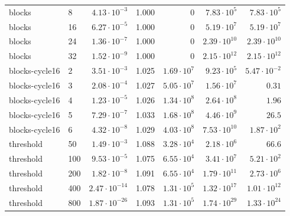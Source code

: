 \begin{tabular}{llrrrrr}
blocks & 8 & $4.13\cdot10^{-3}$ & 1.000 & $0$ & $7.83\cdot10^{5}$ & $7.83\cdot10^{5}$\\
blocks & 16 & $6.27\cdot10^{-5}$ & 1.000 & $0$ & $5.19\cdot10^{7}$ & $5.19\cdot10^{7}$\\
blocks & 24 & $1.36\cdot10^{-7}$ & 1.000 & $0$ & $2.39\cdot10^{10}$ & $2.39\cdot10^{10}$\\
blocks & 32 & $1.52\cdot10^{-9}$ & 1.000 & $0$ & $2.15\cdot10^{12}$ & $2.15\cdot10^{12}$\\
blocks-cycle16 & 2 & $3.51\cdot10^{-3}$ & 1.025 & $1.69\cdot10^{7}$ & $9.23\cdot10^{5}$ & $5.47\cdot10^{-2}$\\
blocks-cycle16 & 3 & $2.08\cdot10^{-4}$ & 1.027 & $5.05\cdot10^{7}$ & $1.56\cdot10^{7}$ & $0.31$\\
blocks-cycle16 & 4 & $1.23\cdot10^{-5}$ & 1.026 & $1.34\cdot10^{8}$ & $2.64\cdot10^{8}$ & $1.96$\\
blocks-cycle16 & 5 & $7.29\cdot10^{-7}$ & 1.033 & $1.68\cdot10^{8}$ & $4.46\cdot10^{9}$ & $26.5$\\
blocks-cycle16 & 6 & $4.32\cdot10^{-8}$ & 1.029 & $4.03\cdot10^{8}$ & $7.53\cdot10^{10}$ & $1.87\cdot10^{2}$\\
threshold & 50 & $1.49\cdot10^{-3}$ & 1.088 & $3.28\cdot10^{4}$ & $2.18\cdot10^{6}$ & $66.6$\\
threshold & 100 & $9.53\cdot10^{-5}$ & 1.075 & $6.55\cdot10^{4}$ & $3.41\cdot10^{7}$ & $5.21\cdot10^{2}$\\
threshold & 200 & $1.82\cdot10^{-8}$ & 1.091 & $6.55\cdot10^{4}$ & $1.79\cdot10^{11}$ & $2.73\cdot10^{6}$\\
threshold & 400 & $2.47\cdot10^{-14}$ & 1.078 & $1.31\cdot10^{5}$ & $1.32\cdot10^{17}$ & $1.01\cdot10^{12}$\\
threshold & 800 & $1.87\cdot10^{-26}$ & 1.093 & $1.31\cdot10^{5}$ & $1.74\cdot10^{29}$ & $1.33\cdot10^{24}$\\
\bottomrule
\end{tabular}
